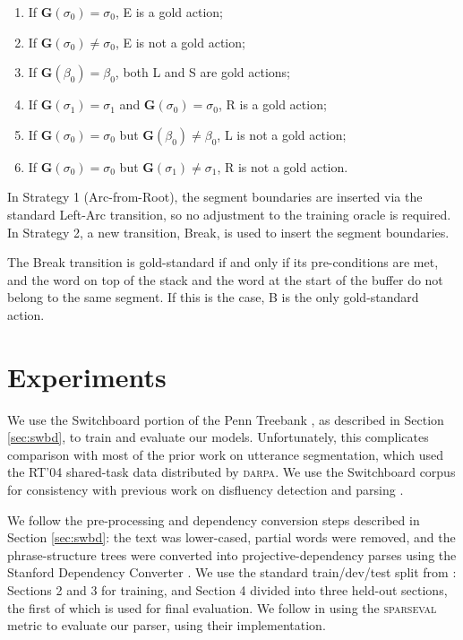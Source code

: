 \documentclass[11pt,letterpaper]{article}
\newcommand{\sparseval}{\textsc{sparseval}\xspace}
\begin{document}
\begin{enumerate}
    \item If $\mathbf{G}(\sigma_0) = \sigma_0$, E is a gold action;
    \item If $\mathbf{G}(\sigma_0) \not= \sigma_0$, E is not a gold action;
    \item If $\mathbf{G}(\beta_0) = \beta_0$, both L and S are gold actions;
    \item If $\mathbf{G}(\sigma_1)= \sigma_1$ and $\mathbf{G}(\sigma_0) = \sigma_0$, R
        is a gold action;
    \item If $\mathbf{G}(\sigma_0) = \sigma_0$ but $\mathbf{G}(\beta_0) \not= \beta_0$,
          L is not a gold action;
      \item If $\mathbf{G}(\sigma_0) = \sigma_0$ but $\mathbf{G}(\sigma_1) \not= \sigma_1$,
          R is not a gold action.
\end{enumerate}

\noindent In Strategy 1 (Arc-from-Root), the segment boundaries are inserted
via the standard Left-Arc transition, so no adjustment to the training oracle
is required.  In Strategy 2, a new transition, Break, is used to insert the
segment boundaries. 

The Break transition is gold-standard if and only if its pre-conditions
are met, and the word on top of the stack and the word at the start of the buffer
do not belong to the same segment.  If this is the case, B is the only gold-standard
action.

\section{Experiments}

We use the Switchboard portion of the Penn Treebank \citep{marcus:93}, as
described in Section \ref{sec:swbd}, to train and evaluate our models.  Unfortunately,
this complicates comparison with most of the prior work on utterance segmentation,
which used the RT'04 shared-task data distributed by \textsc{darpa}.  We use
the Switchboard corpus for consistency with previous work on disfluency 
detection and parsing \citep{qian:13,rasooli:13,honnibal:14}.

We follow the pre-processing and dependency conversion steps described in
Section \ref{sec:swbd}: the text was lower-cased, partial words were removed,
and the phrase-structure trees were converted into projective-dependency parses
using the Stanford Dependency Converter \citep{stanford_deps}.
We use the standard train/dev/test split from \citet{Charniak01a}: Sections 2
and 3 for training, and Section 4 divided into three held-out sections, the first
of which is used for final evaluation.
We follow \citet{honnibal:14} in using the \sparseval \citep{sparseval}
metric to evaluate our parser, using their implementation.
\end{document}
